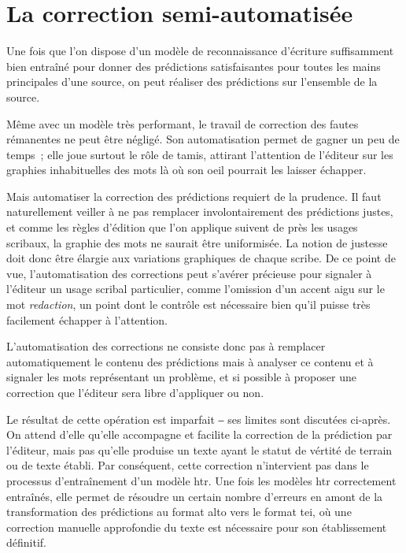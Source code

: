 \documentclass[a4paper,12pt,twoside]{book}
\begin{document}
		\section{La correction semi-automatisée}
			Une fois que l'on dispose d'un modèle de reconnaissance d'écriture suffisamment bien entraîné pour donner des prédictions satisfaisantes pour toutes les mains principales d'une source, on peut réaliser des prédictions sur l'ensemble de la source.
			
			Même avec un modèle très performant, le travail de correction des fautes rémanentes ne peut être négligé. Son automatisation permet de gagner un peu de temps~; elle joue surtout le rôle de tamis, attirant l'attention de l'éditeur sur les graphies inhabituelles des mots là où son oeil pourrait les laisser échapper.
			
			Mais automatiser la correction des prédictions requiert de la prudence. Il faut naturellement veiller à ne pas remplacer involontairement des prédictions justes, et comme les règles d'édition que l'on applique suivent de près les usages scribaux, la graphie des mots ne saurait être uniformisée. La notion de justesse doit donc être élargie aux variations graphiques de chaque scribe. De ce point de vue, l'automatisation des corrections peut s'avérer précieuse pour signaler à l'éditeur un usage scribal particulier, comme l'omission d'un accent aigu sur le mot \textit{redaction}, un point dont le contrôle est nécessaire bien qu'il puisse très facilement échapper à l'attention.
			
			L'automatisation des corrections ne consiste donc pas à remplacer automatiquement le contenu des prédictions mais à analyser ce contenu et à signaler les mots représentant un problème, et si possible à proposer une correction que l'éditeur sera libre d'appliquer ou non.
			
			Le résultat de cette opération est imparfait ‒ ses limites sont discutées ci-après. On attend d'elle qu'elle accompagne et facilite la correction de la prédiction par l'éditeur, mais pas qu'elle produise un texte ayant le statut de vértité de terrain ou de texte établi. Par conséquent, cette correction n'intervient pas dans le processus d'entraînement d'un modèle \gls{htr}. Une fois les modèles \gls{htr} correctement entraînés, elle permet de résoudre un certain nombre d'erreurs en amont de la transformation des prédictions au format \gls{alto} vers le format \gls{tei}, où une correction manuelle approfondie du texte est nécessaire pour son établissement définitif.
			
\end{document}
